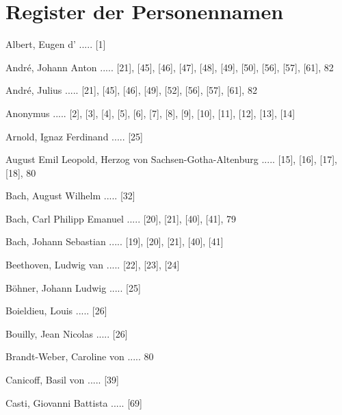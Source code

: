 \documentclass[a4paper, twocolumn, 11pt]{book}
\begin{document}
\chapter*{\centering Register der Personennamen}
\fancyhead{}


\newline 
Albert, Eugen d' ..... [1]

\newline 
André, Johann Anton ..... [21], [45], [46], [47], [48], [49], [50], [56], [57], [61], 82

\newline 
André, Julius ..... [21], [45], [46], [49], [52], [56], [57], [61], 82

\newline 
Anonymus ..... [2], [3], [4], [5], [6], [7], [8], [9], [10], [11], [12], [13], [14]

\newline 
Arnold, Ignaz Ferdinand ..... [25]

\newline 
August Emil Leopold, Herzog von Sachsen-Gotha-Altenburg ..... [15], [16], [17], [18], 80

\newline 
Bach, August Wilhelm ..... [32]

\newline 
Bach, Carl Philipp Emanuel ..... [20], [21], [40], [41], 79

\newline 
Bach, Johann Sebastian ..... [19], [20], [21], [40], [41]

\newline 
Beethoven, Ludwig van ..... [22], [23], [24]

\newline 
Böhner, Johann Ludwig ..... [25]

\newline 
Boieldieu, Louis ..... [26]

\newline 
Bouilly, Jean Nicolas ..... [26]

\newline 
Brandt-Weber, Caroline von ..... 80

\newline 
Canicoff, Basil von ..... [39]

\newline 
Casti, Giovanni Battista ..... [69]
\end{document}
